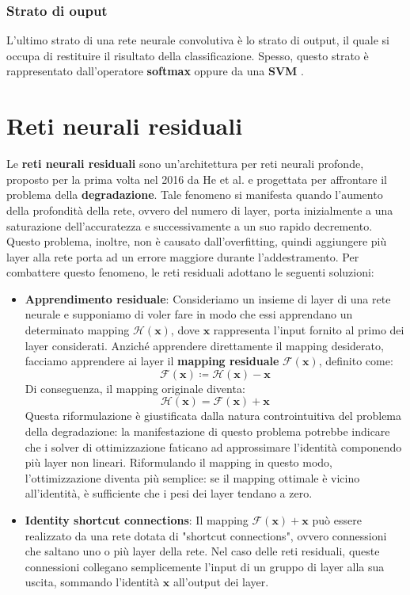 \subsubsection{Strato di ouput}
L'ultimo strato di una rete neurale convolutiva è lo strato di output, il quale si occupa di restituire il risultato della classificazione. Spesso, questo strato è rappresentato dall'operatore \textbf{softmax} oppure da una \textbf{SVM} \cite{gu_recent_2018}.
\section{Reti neurali residuali}
Le \textbf{reti neurali residuali} sono un'architettura per reti neurali profonde, proposto per la prima volta nel 2016 da He et al. \cite{he_deep_2016} e progettata per affrontare il problema della \textbf{degradazione}. Tale fenomeno si manifesta quando l'aumento della profondità della rete, ovvero del numero di layer, porta inizialmente a una saturazione dell'accuratezza e successivamente a un suo rapido decremento. Questo problema, inoltre, non è causato dall'overfitting, quindi aggiungere più layer alla rete porta ad un errore maggiore durante l'addestramento.  Per combattere questo fenomeno, le reti residuali adottano le seguenti soluzioni:
\begin{itemize}
    \item \textbf{Apprendimento residuale}: Consideriamo un insieme di layer di una rete neurale e supponiamo di voler fare in modo che essi apprendano un determinato mapping $\mathcal{H}(\boldsymbol{x})$, dove $\boldsymbol{x}$ rappresenta l'input fornito al primo dei layer considerati. Anziché apprendere direttamente il mapping desiderato, facciamo apprendere ai layer il \textbf{mapping residuale} $\mathcal{F}(\boldsymbol{x})$, definito come:
    $$\mathcal{F}(\boldsymbol{x}) \coloneqq \mathcal{H}(\boldsymbol{x}) - \boldsymbol{x}$$
    Di conseguenza, il mapping originale diventa:
    $$\mathcal{H}(\boldsymbol{x}) = \mathcal{F}(\boldsymbol{x}) + \boldsymbol{x}$$
    Questa riformulazione è giustificata dalla natura controintuitiva del problema della degradazione: la manifestazione di questo problema potrebbe indicare che i solver di ottimizzazione faticano ad approssimare l'identità componendo più layer non lineari. Riformulando il mapping in questo modo, l'ottimizzazione diventa più semplice: se il mapping ottimale è vicino all'identità, è sufficiente che i pesi dei layer tendano a zero.
    \item \textbf{Identity shortcut connections}: Il mapping $\mathcal{F}(\boldsymbol{x}) + \boldsymbol{x}$ può essere realizzato da una rete dotata di "shortcut connections", ovvero connessioni che saltano uno o più layer della rete. Nel caso delle reti residuali, queste connessioni collegano semplicemente l'input di un gruppo di layer alla sua uscita, sommando l'identità $\boldsymbol{x}$ all'output dei layer.
\end{itemize}
